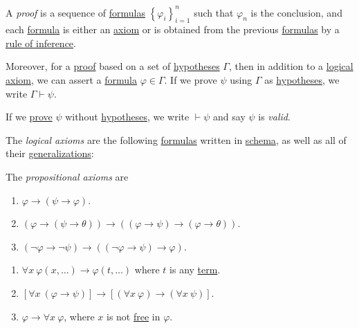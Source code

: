 \begin{definition}[Proof]\label{def:proof}
	A \emph{proof} is a sequence of \hyperref[def:formula]{formulas} \(\left\{ \varphi _i \right\} _{i=1}^n\) such that \(\varphi _n\) is the conclusion, and each \hyperref[def:formula]{formula} is either an \hyperref[def:logical-axioms]{axiom} or is obtained from the previous \hyperref[def:formula]{formulas} by a \hyperref[def:rule-of-inference]{rule of inference}.

	Moreover, for a \hyperref[def:proof]{proof} based on a set of \hyperref[not:hypothesis]{hypotheses} \(\Gamma \), then in addition to a \hyperref[def:logical-axioms]{logical axiom}, we can assert a \hyperref[def:formula]{formula} \(\varphi \in \Gamma \). If we prove \(\psi \) using \(\Gamma \) as \hyperref[not:hypothesis]{hypotheses}, we write \(\Gamma \vdash \psi \).

	\begin{definition}[Valid]\label{def:valid}
		If we \hyperref[def:proof]{prove} \(\psi \) without \hyperref[not:hypothesis]{hypotheses}, we write \(\vdash \psi \) and say \(\psi \) is \emph{valid}.
	\end{definition}

	\begin{definition}\label{def:logical-axioms}
		The \emph{logical axioms} are the following \hyperref[def:formula]{formulas} written in \hyperref[not:schema]{schema}, as well as all of their \hyperref[def:generalization]{generalizations}:
		\begin{definition}\label{def:propositional-axioms}
			The \emph{propositional axioms} are
			\begin{enumerate}[label=(A\arabic*), resume*]
				\item\label{A1} \(\varphi \to  (\psi \to \varphi )\).
				\item\label{A2} \((\varphi \to (\psi \to \theta )) \to ((\varphi \to  \psi ) \to (\varphi \to \theta ))\).
				\item\label{A3} \((\lnot \varphi \to \lnot \psi ) \to  ((\lnot \varphi \to \psi ) \to \varphi )\).
			\end{enumerate}
		\end{definition}

		\begin{enumerate}[label=(A\arabic*), resume]
			\item\label{A4} \(\forall x\ \varphi (x, \dots ) \to \varphi (t, \dots )\) where \(t\) is any \hyperref[def:term]{term}.
			\item\label{A5} \(\left[ \forall x\ (\varphi \to \psi ) \right] \to \left[ (\forall x\ \varphi ) \to (\forall x\ \psi ) \right] \).
			\item\label{A6} \(\varphi \to  \forall x\ \varphi \), where \(x\) is not \hyperref[def:free-variable]{free} in \(\varphi \).
		\end{enumerate}


\end{definition}
\end{definition}
